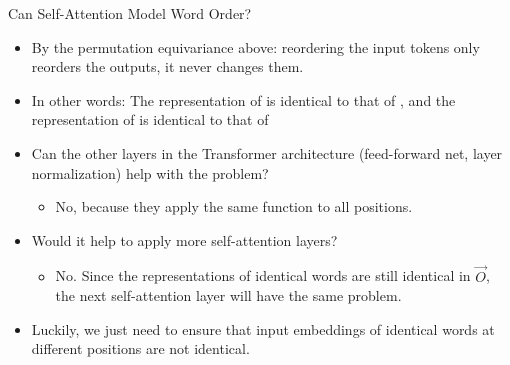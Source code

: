 \begin{frame}{Can Self-Attention Model Word Order?}
\footnotesize

\vfill

\begin{itemize}
\item By the permutation equivariance above: reordering the input tokens only reorders the outputs, it never changes them.
\item In other words: The representation of  is identical to that of , and the representation of  is identical to that of 
\item \ques Can the other layers in the Transformer architecture (feed-forward net, layer normalization) help with the problem?
\begin{itemize}
\item No, because they apply the same function to all positions.
\end{itemize}
\item \ques Would it help to apply more self-attention layers?
\begin{itemize}
\item No. Since the representations of identical words are still identical in $\vec O$, the next self-attention layer will have the same problem.
\end{itemize}
\item Luckily, we just need to ensure that input embeddings of identical words at different positions are not identical.
\end{itemize}

\vfill

\end{frame}

